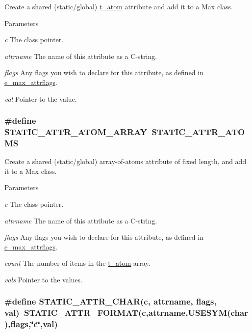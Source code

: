 Create a shared (static/global) \hyperlink{structt__atom}{t\_\-atom} attribute and add it to a Max class. 
\begin{DoxyParams}{Parameters}
\item[{\em c}]The class pointer. \item[{\em attrname}]The name of this attribute as a C-\/string. \item[{\em flags}]Any flags you wish to declare for this attribute, as defined in \hyperlink{group__attr_gaf296cfc6741bb19207f6ed8062809115}{e\_\-max\_\-attrflags}. \item[{\em val}]Pointer to the value. \end{DoxyParams}
\hypertarget{group__attr_ga04a253a4e0c92cd4fdc36e5f73478532}{
\subsubsection[{STATIC\_\-ATTR\_\-ATOM\_\-ARRAY}]{\setlength{\rightskip}{0pt plus 5cm}\#define STATIC\_\-ATTR\_\-ATOM\_\-ARRAY~STATIC\_\-ATTR\_\-ATOMS}}
\label{group__attr_ga04a253a4e0c92cd4fdc36e5f73478532}


Create a shared (static/global) array-\/of-\/atoms attribute of fixed length, and add it to a Max class. 
\begin{DoxyParams}{Parameters}
\item[{\em c}]The class pointer. \item[{\em attrname}]The name of this attribute as a C-\/string. \item[{\em flags}]Any flags you wish to declare for this attribute, as defined in \hyperlink{group__attr_gaf296cfc6741bb19207f6ed8062809115}{e\_\-max\_\-attrflags}. \item[{\em count}]The number of items in the \hyperlink{structt__atom}{t\_\-atom} array. \item[{\em vals}]Pointer to the values. \end{DoxyParams}
\hypertarget{group__attr_ga3d4b3c34060baa3e96904a08d2b92c82}{
\subsubsection[{STATIC\_\-ATTR\_\-CHAR}]{\setlength{\rightskip}{0pt plus 5cm}\#define STATIC\_\-ATTR\_\-CHAR(c, \/  attrname, \/  flags, \/  val)~STATIC\_\-ATTR\_\-FORMAT(c,attrname,USESYM(char),flags,\char`\"{}c\char`\"{},val)}}
\label{group__attr_ga3d4b3c34060baa3e96904a08d2b92c82}


